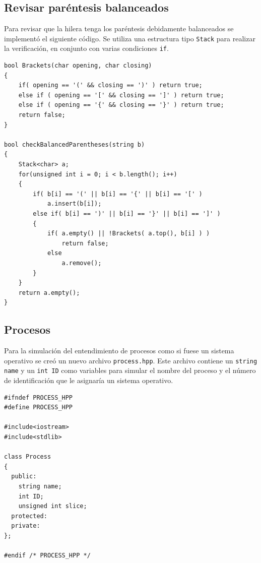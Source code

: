\subsection{Revisar paréntesis balanceados}
Para revisar que la hilera tenga los paréntesis debidamente balanceados se implementó el siguiente código. Se utiliza una estructura tipo \texttt{Stack} para realizar la verificación, en conjunto con varias condiciones \texttt{if}. 

\begin{verbatim}
bool Brackets(char opening, char closing)
{
	if( opening == '(' && closing == ')' ) return true;
	else if ( opening == '[' && closing == ']' ) return true;
	else if ( opening == '{' && closing == '}' ) return true;
	return false;
}

bool checkBalancedParentheses(string b)
{
	Stack<char> a;
	for(unsigned int i = 0; i < b.length(); i++)
	{
	    if( b[i] == '(' || b[i] == '{' || b[i] == '[' )
	        a.insert(b[i]);
        else if( b[i] == ')' || b[i] == '}' || b[i] == ']' )
        {
            if( a.empty() || !Brackets( a.top(), b[i] ) )
                return false;
            else
                a.remove();
        }
    }
    return a.empty();
}
\end{verbatim}

\subsection{Procesos}
Para la simulación del entendimiento de procesos como si fuese un sistema operativo se creó un nuevo archivo \texttt{process.hpp}. Este archivo contiene un \texttt{string name} y un \texttt{int ID} como variables para simular el nombre del proceso y el número de identificación que le asignaría un sistema operativo. 

\begin{verbatim}
#ifndef PROCESS_HPP
#define PROCESS_HPP

#include<iostream>
#include<stdlib>

class Process
{
  public:
    string name;
    int ID;
    unsigned int slice;
  protected:
  private:
};

#endif /* PROCESS_HPP */
\end{verbatim}


